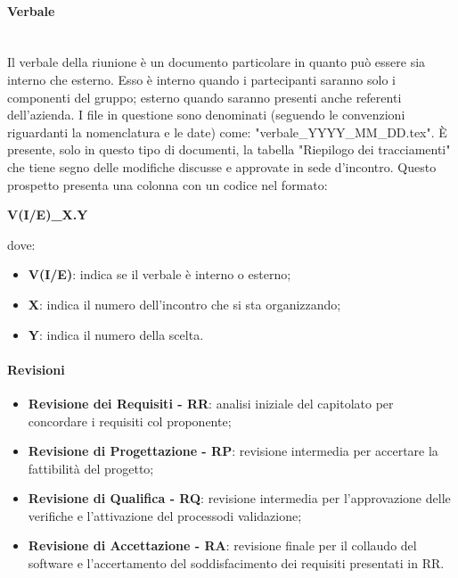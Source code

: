             \paragraph*{Verbale}\mbox{}\\ [1mm]
                Il verbale della riunione è un documento particolare in quanto può essere sia interno che esterno. Esso è interno quando
                i partecipanti saranno solo i componenti del gruppo; esterno quando saranno presenti anche referenti dell'azienda. I file in questione sono denominati (seguendo le convenzioni riguardanti la nomenclatura e le date) come: "verbale\_YYYY\_MM\_DD.tex".
                È presente, solo in questo tipo di documenti, la tabella "Riepilogo dei tracciamenti" che tiene segno delle modifiche discusse e
                approvate in sede d'incontro. Questo prospetto presenta una colonna con un codice nel formato: \newline \newline
                \centerline{\textbf{V(I/E)\_X.Y}} \newline \newline
                dove:
                \begin{itemize}
                    \item \textbf{V(I/E)}: indica se il verbale è interno o esterno;
                    \item \textbf{X}: indica il numero dell'incontro che si sta organizzando;
                    \item \textbf{Y}: indica il numero della scelta.
                \end{itemize}
            \paragraph*{Revisioni}
	            \begin{itemize}
	                \item \textbf{Revisione dei Requisiti - RR}: analisi iniziale del capitolato per concordare i requisiti col proponente;
	                \item \textbf{Revisione di Progettazione - RP}: revisione intermedia per accertare la fattibilità del progetto\glo;
	                \item \textbf{Revisione di Qualifica - RQ}: revisione intermedia per l'approvazione delle verifiche e l'attivazione del processo\glosp di validazione\glo;
	                \item \textbf{Revisione di Accettazione - RA}: revisione finale per il collaudo del software e l'accertamento del soddisfacimento dei requisiti presentati in RR.
	            \end{itemize}
